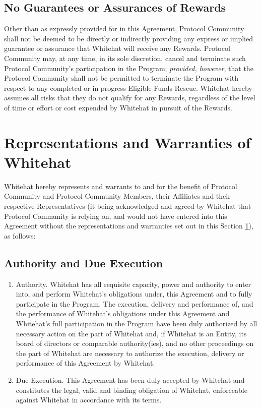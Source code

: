 \documentclass{article}
\begin{document}
\subsection{No Guarantees or Assurances of Rewards}\label{subsec:no_guarantees}

Other than as expressly provided for in this Agreement, Protocol Community shall not be deemed to be directly or indirectly providing any express or implied guarantee or assurance that Whitehat will receive any Rewards. Protocol Community may, at any time, in its sole discretion, cancel and terminate such Protocol Community's participation in the Program; \textit{provided, however}, that the Protocol Community shall not be permitted to terminate the Program with respect to any completed or in-progress Eligible Funds Rescue. Whitehat hereby assumes all risks that they do not qualify for any Rewards, regardless of the level of time or effort or cost expended by Whitehat in pursuit of the Rewards.

\section{Representations and Warranties of Whitehat}\label{sec:warranties}

Whitehat hereby represents and warrants to and for the benefit of Protocol Community and Protocol Community Members, their Affiliates and their respective Representatives (it being acknowledged and agreed by Whitehat that Protocol Community is relying on, and would not have entered into this Agreement without the representations and warranties set out in this Section \ref{sec:warranties}), as follows:

\subsection{Authority and Due Execution}\label{subsec:authority}

\begin{enumerate}[label=\Alph*.]
    \item Authority. Whitehat has all requisite capacity, power and authority to enter into, and perform Whitehat's obligations under, this Agreement and to fully participate in the Program. The execution, delivery and performance of, and the performance of Whitehat's obligations under this Agreement and Whitehat's full participation in the Program have been duly authorized by all necessary action on the part of Whitehat and, if Whitehat is an Entity, its board of directors or comparable authority(ies), and no other proceedings on the part of Whitehat are necessary to authorize the execution, delivery or performance of this Agreement by Whitehat.

    \item Due Execution. This Agreement has been duly accepted by Whitehat and constitutes the legal, valid and binding obligation of Whitehat, enforceable against Whitehat in accordance with its terms.

\end{enumerate}
\end{document}
